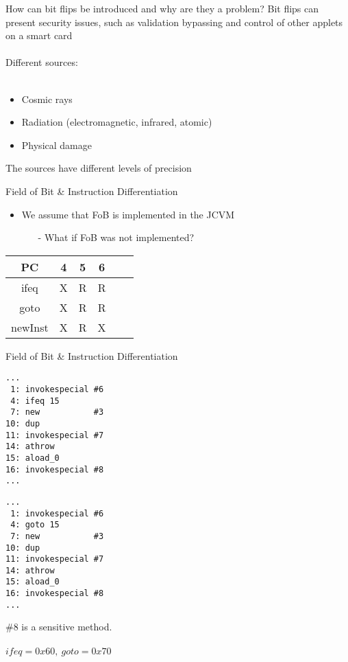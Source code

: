 \begin{frame}[fragile]{\large How can bit flips be introduced and why are they a problem?}
Bit flips can present security issues, such as validation bypassing and control of other applets on a smart card\\~\\
Different sources:\\~\\
	\begin{itemize}
	\item Cosmic rays
	\item Radiation (electromagnetic, infrared, atomic)
	\item Physical damage
	\end{itemize}
	
The sources have different levels of precision
\end{frame}
\begin{frame}[fragile]{Field of Bit \& Instruction Differentiation}
\begin{itemize}
\item We assume that FoB is implemented in the JCVM
\begin{itemize}
\item[-] What if FoB was not implemented?
\end{itemize}
\end{itemize}
\begin{table}
\centering
\begin{tabular}{|c|c|c|c|c|c|}
\hline PC & 4 & 5 & 6   \\ 
\hline ifeq & X & R & R \\ 
\hline goto & X & R & R \\ 
\hline newInst & X & R & X \\ 
\hline 
\end{tabular} 
\end{table}
\end{frame}

\begin{frame}[fragile]{Field of Bit \& Instruction Differentiation}
\begin{minipage}{.45\textwidth}
\begin{lstlisting}[frame=single]
...
 1: invokespecial #6
 4: ifeq 15
 7: new           #3
10: dup
11: invokespecial #7
14: athrow
15: aload_0
16: invokespecial #8
...
\end{lstlisting}
\end{minipage}%
\hspace{20px}
\begin{minipage}{0.45\textwidth}
\begin{lstlisting}[frame=single]
...
 1: invokespecial #6
 4: goto 15
 7: new           #3
10: dup
11: invokespecial #7
14: athrow
15: aload_0
16: invokespecial #8
...
\end{lstlisting}
\end{minipage}
\begin{center}
\#8 is a sensitive method.\\~\\$ifeq = 0x60,\:goto = 0x70$
\end{center}
\end{frame}

